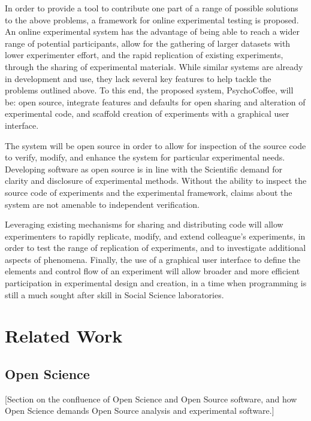 \documentclass[12pt,a4paper,titlepage]{scrreprt}
\begin{document}
    In order to provide a tool to contribute one part of a range of possible solutions to the above problems, a framework for online experimental testing is proposed. An online experimental system has the advantage of being able to reach a wider range of potential participants, allow for the gathering of larger datasets with lower experimenter effort, and the rapid replication of existing experiments, through the sharing of experimental materials. While similar systems are already in development and use, they lack several key features to help tackle the problems outlined above. To this end, the proposed system, PsychoCoffee, will be: open source, integrate features and defaults for open sharing and alteration of experimental code, and scaffold creation of experiments with a graphical user interface.

    The system will be open source in order to allow for inspection of the source code to verify, modify, and enhance the system for particular experimental needs. Developing software as open source is in line with the Scientific demand for clarity and disclosure of experimental methods. Without the ability to inspect the source code of experiments and the experimental framework, claims about the system are not amenable to independent verification.

    Leveraging existing mechanisms for sharing and distributing code will allow experimenters to rapidly replicate, modify, and extend colleague's experiments, in order to test the range of replication of experiments, and to investigate additional aspects of phenomena. Finally, the use of a graphical user interface to define the elements and control flow of an experiment will allow broader and more efficient participation in experimental design and creation, in a time when programming is still a much sought after skill in Social Science laboratories.

\newpage

\chapter{Related Work}
\section{Open Science}
[Section on the confluence of Open Science and Open Source software, and how Open Science demands Open Source analysis and experimental software.]
\end{document}
